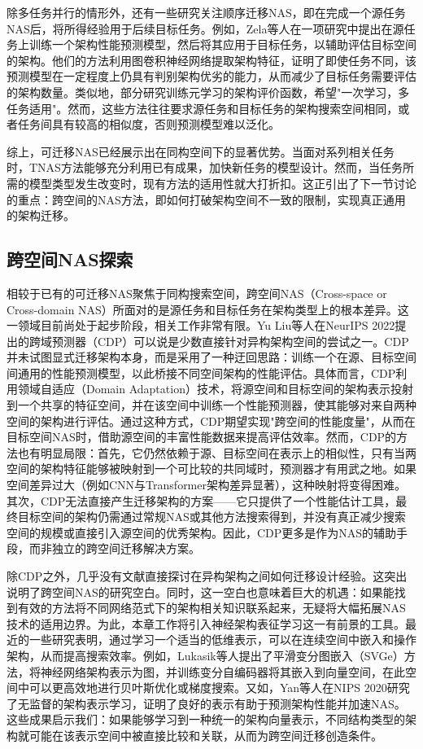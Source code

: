 \documentclass[../main.tex]{subfiles}
\begin{document}
除多任务并行的情形外，还有一些研究关注顺序迁移NAS，即在完成一个源任务NAS后，将所得经验用于后续目标任务。例如，Zela等人在一项研究中提出在源任务上训练一个架构性能预测模型，然后将其应用于目标任务，以辅助评估目标空间的架构。他们的方法利用图卷积神经网络提取架构特征，证明了即使任务不同，该预测模型在一定程度上仍具有判别架构优劣的能力，从而减少了目标任务需要评估的架构数量。类似地，部分研究训练元学习的架构评价函数，希望"一次学习，多任务适用"。然而，这些方法往往要求源任务和目标任务的架构搜索空间相同，或者任务间具有较高的相似度，否则预测模型难以泛化。

综上，可迁移NAS已经展示出在同构空间下的显著优势。当面对系列相关任务时，TNAS方法能够充分利用已有成果，加快新任务的模型设计。然而，当任务所需的模型类型发生改变时，现有方法的适用性就大打折扣。这正引出了下一节讨论的重点：跨空间的NAS方法，即如何打破架构空间不一致的限制，实现真正通用的架构迁移。

\subsection{跨空间NAS探索}

相较于已有的可迁移NAS聚焦于同构搜索空间，跨空间NAS（Cross-space or Cross-domain NAS）所面对的是源任务和目标任务在架构类型上的根本差异。这一领域目前尚处于起步阶段，相关工作非常有限。Yu Liu等人在NeurIPS 2022提出的跨域预测器（CDP）可以说是少数直接针对异构架构空间的尝试之一。CDP并未试图显式迁移架构本身，而是采用了一种迂回思路：训练一个在源、目标空间间通用的性能预测模型，以此桥接不同空间架构的性能评估。具体而言，CDP利用领域自适应（Domain Adaptation）技术，将源空间和目标空间的架构表示投射到一个共享的特征空间，并在该空间中训练一个性能预测器，使其能够对来自两种空间的架构进行评估。通过这种方式，CDP期望实现"跨空间的性能度量"，从而在目标空间NAS时，借助源空间的丰富性能数据来提高评估效率。然而，CDP的方法也有明显局限：首先，它仍然依赖于源、目标空间在表示上的相似性，只有当两空间的架构特征能够被映射到一个可比较的共同域时，预测器才有用武之地。如果空间差异过大（例如CNN与Transformer架构差异显著），这种映射将变得困难。其次，CDP无法直接产生迁移架构的方案——它只提供了一个性能估计工具，最终目标空间的架构仍需通过常规NAS或其他方法搜索得到，并没有真正减少搜索空间的规模或直接引入源空间的优秀架构。因此，CDP更多是作为NAS的辅助手段，而非独立的跨空间迁移解决方案。

除CDP之外，几乎没有文献直接探讨在异构架构之间如何迁移设计经验。这突出说明了跨空间NAS的研究空白。同时，这一空白也意味着巨大的机遇：如果能找到有效的方法将不同网络范式下的架构相关知识联系起来，无疑将大幅拓展NAS技术的适用边界。为此，本章工作将引入神经架构表征学习这一有前景的工具。最近的一些研究表明，通过学习一个适当的低维表示，可以在连续空间中嵌入和操作架构，从而提高搜索效率。例如，Lukasik等人提出了平滑变分图嵌入（SVGe）方法，将神经网络架构表示为图，并训练变分自编码器将其嵌入到向量空间，在此空间中可以更高效地进行贝叶斯优化或梯度搜索。又如，Yan等人在NIPS 2020研究了无监督的架构表示学习，证明了良好的表示有助于预测架构性能并加速NAS。这些成果启示我们：如果能够学习到一种统一的架构向量表示，不同结构类型的架构就可能在该表示空间中被直接比较和关联，从而为跨空间迁移创造条件。
\end{document}
